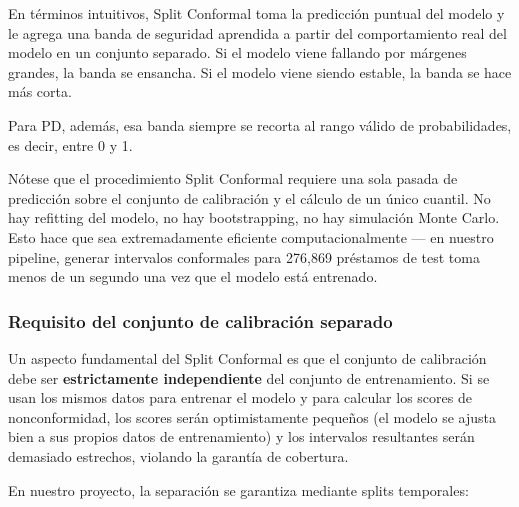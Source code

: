 \documentclass[
  spanish,
  11pt,
  letterpaper,
]{scrbook}
\theoremstyle{plain}
\theoremstyle{remark}
\begin{document}
En términos intuitivos, Split Conformal toma la predicción puntual del
modelo y le agrega una banda de seguridad aprendida a partir del
comportamiento real del modelo en un conjunto separado. Si el modelo
viene fallando por márgenes grandes, la banda se ensancha. Si el modelo
viene siendo estable, la banda se hace más corta.

Para PD, además, esa banda siempre se recorta al rango válido de
probabilidades, es decir, entre 0 y 1.

\begin{tcolorbox}[enhanced jigsaw, arc=.35mm, bottomrule=.15mm, bottomtitle=1mm, breakable, colback=white, colbacktitle=quarto-callout-tip-color!10!white, colframe=quarto-callout-tip-color-frame, coltitle=black, left=2mm, leftrule=.75mm, opacityback=0, opacitybacktitle=0.6, rightrule=.15mm, title=\textcolor{quarto-callout-tip-color}{\faLightbulb}\hspace{0.5em}{Elegancia computacional}, titlerule=0mm, toprule=.15mm, toptitle=1mm]

Nótese que el procedimiento Split Conformal requiere una sola pasada de
predicción sobre el conjunto de calibración y el cálculo de un único
cuantil. No hay refitting del modelo, no hay bootstrapping, no hay
simulación Monte Carlo. Esto hace que sea extremadamente eficiente
computacionalmente --- en nuestro pipeline, generar intervalos
conformales para 276,869 préstamos de test toma menos de un segundo una
vez que el modelo está entrenado.

\end{tcolorbox}

\subsubsection{Requisito del conjunto de calibración
separado}\label{sec-calibration-holdout}

Un aspecto fundamental del Split Conformal es que el conjunto de
calibración debe ser \textbf{estrictamente independiente} del conjunto
de entrenamiento. Si se usan los mismos datos para entrenar el modelo y
para calcular los scores de nonconformidad, los scores serán
optimistamente pequeños (el modelo se ajusta bien a sus propios datos de
entrenamiento) y los intervalos resultantes serán demasiado estrechos,
violando la garantía de cobertura.

En nuestro proyecto, la separación se garantiza mediante splits
temporales:
\end{document}
